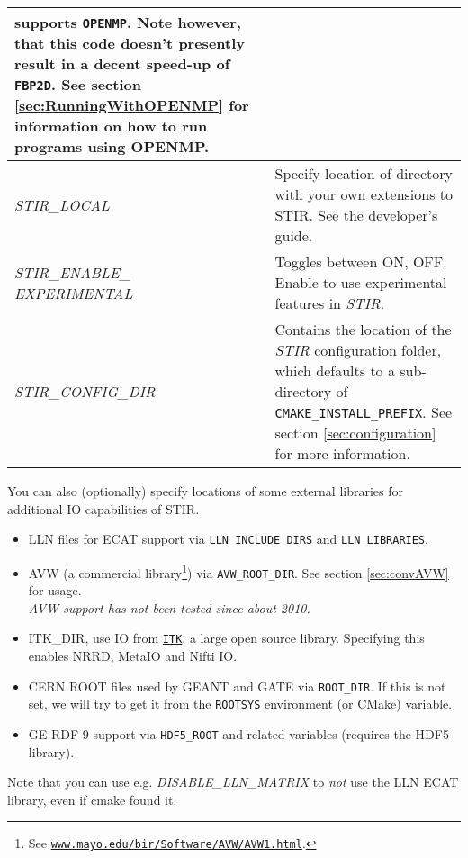 \documentclass{article}
\def\url#1#2{\mbox{\href{#1}{\tt #2}}}
\begin{document}
\begin{longtable}{|p{\MakeTableFirstCol}|p{\MakeTableSecondCol}|}
{{supports \texttt{OPENMP}. Note however, that this code doesn't presently result 
in a decent speed-up of \texttt{FBP2D}.}
See section \ref{sec:RunningWithOPENMP} for information on how to run programs using OPENMP.
} \\
\hline
{\raggedright \textit{STIR\_LOCAL}} & 
{\raggedright Specify location of directory with your own extensions to STIR. See
the developer's guide.}\\
\hline
{\raggedright \textit{STIR\_ENABLE\_\\EXPERIMENTAL}} & 
{\raggedright Toggles between ON, OFF. Enable to use experimental features in \textit{STIR}.}\\
\hline
{\raggedright \textit{STIR\_CONFIG\_DIR}} & 
{\raggedright Contains the location of the \textit{STIR} configuration folder, which defaults to a sub-directory of \texttt{CMAKE\_INSTALL\_PREFIX}. See section \ref{sec:configuration} for more information.}\\
\hline
\end{longtable}

You can also (optionally) specify locations of some external libraries for additional IO
capabilities of STIR. 
\begin{itemize}
\item LLN files for ECAT support via \texttt{LLN\_INCLUDE\_DIRS} and \texttt{LLN\_LIBRARIES}.
\item AVW\texttrademark{} (a commercial library\footnote{See \url{http://www.mayo.edu/bir/Software/AVW/AVW1.html}
{www.mayo.edu/bir/Software/AVW/AVW1.html}.})
via \texttt{AVW\_ROOT\_DIR}. See section \ref{sec:convAVW} for usage.\\
\textit{AVW support has not been tested since about 2010.}
\item ITK\_DIR, use IO from \url{http://www.itk.org}{ITK}, a large open source library. Specifying this
 enables NRRD, MetaIO and Nifti IO.
\item CERN ROOT files used by GEANT and GATE via \texttt{ROOT\_DIR}.
  If this is not set, we will try to get it from the \texttt{ROOTSYS} environment (or CMake) variable.
\item GE RDF\texttrademark{} 9 support via \texttt{HDF5\_ROOT} and related variables (requires the HDF5 library).
\end{itemize}

Note that you can use e.g. \textit{DISABLE\_LLN\_MATRIX} to \textit{not}
use the LLN ECAT library, even if cmake found it.
\end{document}
